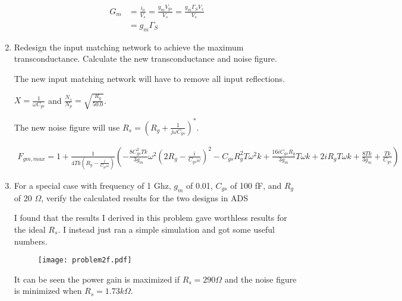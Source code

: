 \begin{enumerate}[label=(\alph*)]
    \begin{align*}
        G_m &= \frac{i_o}{V_s} = \frac{g_m V_{gs}}{V_s} = \frac{g_m \Gamma_S V_s}{V_s} \\
        &= g_m \Gamma_S
    \end{align*}

    \item {\color{blue} Redesign the input matching network to achieve the maximum transconductance. Calculate the new transconductance and noise figure.}

    The new input matching network will have to remove all input reflections.

    $X = \frac{1}{\omega C_{gs}}$ and $\frac{N_s}{N_p} = \sqrt{\frac{R_g}{50.0}}$.

    The new noise figure will use $R_s = (R_g + \frac{1}{j \omega C_{gs}})^*$.

    \begin{multline}
        F_{gm,max} = 1 + \frac{1}{4 T k \left(R_{g} - \frac{i}{C_{gs} \omega}\right)} \left(- \frac{8 C_{gs}^{2} T k}{3 g_{m}} \omega^{2} \left(2 R_{g} - \frac{i}{C_{gs} \omega}\right)^{2} - C_{gs} R_{g}^{2} T \omega^{2} k + \frac{16 i C_{gs} R_{g}}{3 g_{m}} T \omega k + 2 i R_{g} T \omega k + \frac{8 T k}{3 g_{m}} + \frac{T k}{C_{gs}}\right)
    \end{multline}

    \item {\color{blue} For a special case with frequency of 1 Ghz, $g_m$ of 0.01, $C_{gs}$ of 100 fF, and $R_g$ of 20 $\Omega$, verify the calculated results for the two designs in ADS}

    I found that the results I derived in this problem gave worthless results for the ideal $R_s$. I instead just ran a simple simulation and got some useful numbers.

    \begin{figure}[H]
        \centering \texttt{[image: problem2f.pdf]}
    \end{figure}

    It can be seen the power gain is maximized if $R_s = 290 \Omega$ and the noise figure is minimized when $R_s = 1.73 k\Omega$.
\end{enumerate}


